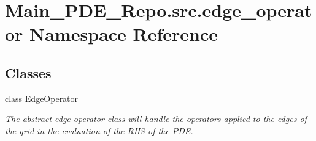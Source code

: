 \hypertarget{namespaceMain__PDE__Repo_1_1src_1_1edge__operator}{}\section{Main\+\_\+\+P\+D\+E\+\_\+\+Repo.\+src.\+edge\+\_\+operator Namespace Reference}
\label{namespaceMain__PDE__Repo_1_1src_1_1edge__operator}
\subsection*{Classes}
\begin{DoxyCompactItemize}
\item 
class \hyperlink{classMain__PDE__Repo_1_1src_1_1edge__operator_1_1EdgeOperator}{Edge\+Operator}
\begin{DoxyCompactList}\small\item\em The abstract edge operator class will handle the operators applied to the edges of the grid in the evaluation of the R\+HS of the P\+DE. \end{DoxyCompactList}\end{DoxyCompactItemize}
